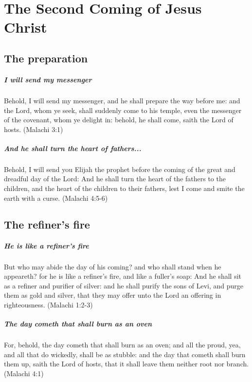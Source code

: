 \chapter{The Second Coming of Jesus Christ}

\section{The preparation}

\paragraph{I will send my messenger}
Behold, I will send my messenger, and he shall prepare the way before me: and the Lord, whom ye seek, shall suddenly come to his temple, even the messenger of the covenant, whom ye delight in: behold, he shall come, saith the Lord of hosts. (Malachi 3:1)

\paragraph{And he shall turn the heart of fathers...}
Behold, I will send you Elijah the prophet before the coming of the great and dreadful day of the Lord: And he shall turn the heart of the fathers to the children, and the heart of the children to their fathers, lest I come and smite the earth with a curse. (Malachi 4:5-6)

\section{The refiner's fire}

\paragraph{He is like a refiner's fire}
But who may abide the day of his coming? and who shall stand when he appeareth? for he is like a refiner's fire, and like a fuller's soap: And he shall sit as a refiner and purifier of silver: and he shall purify the sons of Levi, and purge them as gold and silver, that they may offer unto the Lord an offering in righteousness. (Malachi 1:2-3)

\paragraph{The day cometh that shall burn as an oven}
For, behold, the day cometh that shall burn as an oven; and all the proud, yea, and all that do wickedly, shall be as stubble: and the day that cometh shall burn them up, saith the Lord of hosts, that it shall leave them neither root nor branch. (Malachi 4:1)

